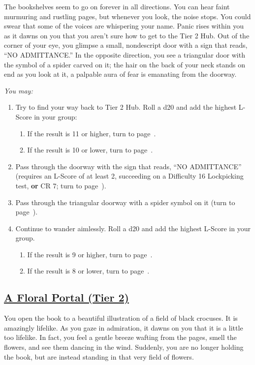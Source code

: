 \documentclass[sheet]{GL2020}
\begin{document}
The bookshelves seem to go on forever in all directions. You can hear faint murmuring and rustling pages, but whenever you look, the noise stops. You could swear that some of the voices are whispering your name. Panic rises within you as it dawns on you that you aren’t sure how to get to the Tier 2 Hub. Out of the corner of your eye, you glimpse a small, nondescript door with a sign that reads, ``NO ADMITTANCE.'' In the opposite direction, you see a triangular door with the symbol of a spider carved on it; the hair on the back of your neck stands on end as you look at it, a palpable aura of fear is emanating from the doorway.

\vspace{0.5cm}

\begingroup
\itshape
You may:
\begin{enumerate}[A]
  \item Try to find your way back to Tier 2 Hub. Roll a d20 and add the highest L-Score in your group: 
	\begin{enumerate}
		\item If the result is 11 or higher, turn to page~\pageref{TierTwoHub}.
		\item If the result is 10 or lower, turn to page~\pageref{LostintheStacks}.
	\end{enumerate}
	\item Pass through the doorway with the sign that reads, ``NO ADMITTANCE'' (requires an L-Score of at least 2, succeeding on a Difficulty 16 Lockpicking test, \textbf{or} CR 7; turn to page~\pageref{HallMisfiled}).
	\item Pass through the triangular doorway with a spider symbol on it (turn to page~\pageref{ChamberoftheFates}).
	\item Continue to wander aimlessly. Roll a d20 and add the highest L-Score in your group. 
	\begin{enumerate}
		\item If the result is 9 or higher, turn to page~\pageref{DeeperStacks}.
		\item If the result is 8 or lower, turn to page~\pageref{LostintheStacks}.
	\end{enumerate}
\end{enumerate}
\endgroup

\clearpage

\begin{center}\section*{\underline{A Floral Portal (Tier 2)}}\end{center}
\label{FloralPortal}
You open the book to a beautiful illustration of a field of black crocuses. It is amazingly lifelike. As you gaze in admiration, it dawns on you that it is a little too lifelike. In fact, you feel a gentle breeze wafting from the pages, smell the flowers, and see them dancing in the wind. Suddenly, you are no longer holding the book, but are instead standing in that very field of flowers.
\end{document}
